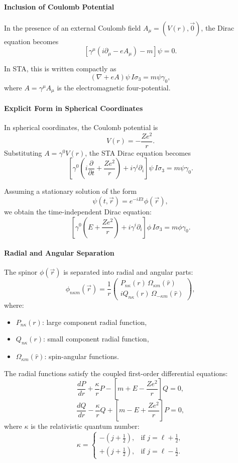 \documentclass[12pt]{article}
\begin{document}
\paragraph{Inclusion of Coulomb Potential}
In the presence of an external Coulomb field \(A_\mu = (V(r), \vec{0})\), the Dirac equation becomes
\[
\left[\gamma^\mu\left(i\partial_\mu - eA_\mu\right) - m\right]\psi = 0.
\]

In STA, this is written compactly as
\[
(\nabla + eA)\psi\,I\sigma_3 = m\psi\gamma_0,
\]
where \(A = \gamma^\mu A_\mu\) is the electromagnetic four-potential.

\paragraph{Explicit Form in Spherical Coordinates}
In spherical coordinates, the Coulomb potential is
\[
V(r) = -\frac{Ze^2}{r}.
\]
Substituting \(A = \gamma^0 V(r)\), the STA Dirac equation becomes
\[
\left[\gamma^0\left(i\frac{\partial}{\partial t} + \frac{Ze^2}{r}\right) + i\gamma^i\partial_i\right]\psi\,I\sigma_3 = m\psi\gamma_0.
\]

Assuming a stationary solution of the form
\[
\psi(t,\vec{r}) = e^{-iEt}\phi(\vec{r}),
\]
we obtain the time-independent Dirac equation:
\[
\left[\gamma^0(E + \frac{Ze^2}{r}) + i\gamma^i\partial_i\right]\phi\,I\sigma_3 = m\phi\gamma_0.
\]

\paragraph{Radial and Angular Separation}
The spinor \(\phi(\vec{r})\) is separated into radial and angular parts:
\[
\phi_{n\kappa m}(\vec{r}) = \frac{1}{r}
\begin{pmatrix}
P_{n\kappa}(r)\,\Omega_{\kappa m}(\hat{r}) \\[1ex]
iQ_{n\kappa}(r)\,\Omega_{-\kappa m}(\hat{r})
\end{pmatrix},
\]
where:
\begin{itemize}
    \item \(P_{n\kappa}(r)\): large component radial function,
    \item \(Q_{n\kappa}(r)\): small component radial function,
    \item \(\Omega_{\kappa m}(\hat{r})\): spin-angular functions.
\end{itemize}

The radial functions satisfy the coupled first-order differential equations:
\[
\frac{dP}{dr} + \frac{\kappa}{r}P - \left[m + E - \frac{Ze^2}{r}\right]Q = 0,
\]
\[
\frac{dQ}{dr} - \frac{\kappa}{r}Q + \left[m - E + \frac{Ze^2}{r}\right]P = 0,
\]
where \(\kappa\) is the relativistic quantum number:
\[
\kappa = \begin{cases}
-(j+\tfrac{1}{2}), & \text{if } j=\ell+\tfrac{1}{2},\\
+(j+\tfrac{1}{2}), & \text{if } j=\ell-\tfrac{1}{2}.
\end{cases}
\]
\end{document}
